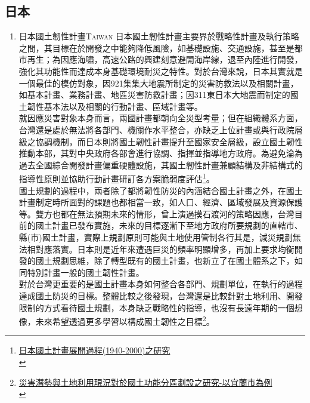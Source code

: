 \documentclass[a4paper,12pt]{article}
\begin{document}
\subsection{日本}
\label{sec:orgc16a94f}
\begin{enumerate}
\item 日本國土韌性計畫\hfill{}\textsc{Taiwan}
\label{sec:org976dfc9}
日本國土韌性計畫主要界於戰略性計畫及執行策略之間，其目標在於開發之中能夠降低風險，如基礎設施、交通設施，甚至是都市再生；為因應海嘯，高速公路的興建刻意避開海岸線，退至內陸進行開發，強化其功能性而達成本身基礎環境耐災之特性。對於台灣來說，日本其實就是一個最佳的模仿對象，因921集集大地震所制定的災害防救法以及相關計畫，如基本計畫、業務計畫、地區災害防救計畫；因311東日本大地震而制定的國土韌性基本法以及相關的行動計畫、區域計畫等。\\

就因應災害對象本身而言，兩國計畫都朝向全災型考量；但在組織體系方面，台灣還是處於無法將各部門、機關作水平整合，亦缺乏上位計畫或與行政院層級之協調機制，而日本則將國土韌性計畫提升至國家安全層級，設立國土韌性推動本部，其對中央政府各部會進行協調、指揮並指導地方政府。為避免淪為過去全國綜合開發計畫偏重硬體設施，其國土韌性計畫兼顧結構及非結構式的指導性原則並協助行動計畫研訂各方案脆弱度評估\footnote{\href{https://www.google.com/url?sa=t\&rct=j\&q=\&esrc=s\&source=web\&cd=\&ved=2ahUKEwjB8anqhMPvAhXQEqYKHeduCgYQFjAAegQIBhAD\&url=http\%3A\%2F\%2Feportfolio.lib.ksu.edu.tw\%2Fuser\%2F4\%2F9\%2F4970T113\%2Frepository\%2FA2-2.pdf\&usg=AOvVaw2Q5Exe9XHwDJNSuRuVsXQD}{日本國土計畫展開過程(1940-2000)之研究}\\}。\\

國土規劃的過程中，兩者除了都將韌性防災的內涵結合國土計畫之外，在國土計畫制定時所面對的課題也都相當一致，如人口、經濟、區域發展及資源保護等。雙方也都在無法預期未來的情形，曾上演過摸石渡河的策略因應，台灣目前的國土計畫已發布實施，未來的目標逐漸下至地方政府所要規劃的直轄市、縣(市)國土計畫，實際上規劃原則可能與土地使用管制各行其是，減災規劃無法相對應落實。日本則是近年來遭遇巨災的頻率明顯增多，再加上要求均衡開發的國土規劃思維，除了轉型既有的國土計畫，也新立了在國土體系之下，如同特別計畫一般的國土韌性計畫。\\

對於台灣更重要的是國土計畫本身如何整合各部門、規劃單位，在執行的過程達成國土防災的目標。整體比較之後發現，台灣還是比較針對土地利用、開發限制的方式看待國土規劃，本身缺乏戰略性的指導，也沒有長遠年期的一個想像，未來希望透過更多學習以構成國土韌性之目標\footnote{\href{https://ndltd.ncl.edu.tw/cgi-bin/gs32/gsweb.cgi/login?o=dnclcdr\&s=id=\%22108MCU00653005\%22.\&searchmode=basic}{災害潛勢與土地利用現況對於國土功能分區劃設之研究-以宜蘭市為例}\\}。\\


\end{enumerate}
\end{document}
